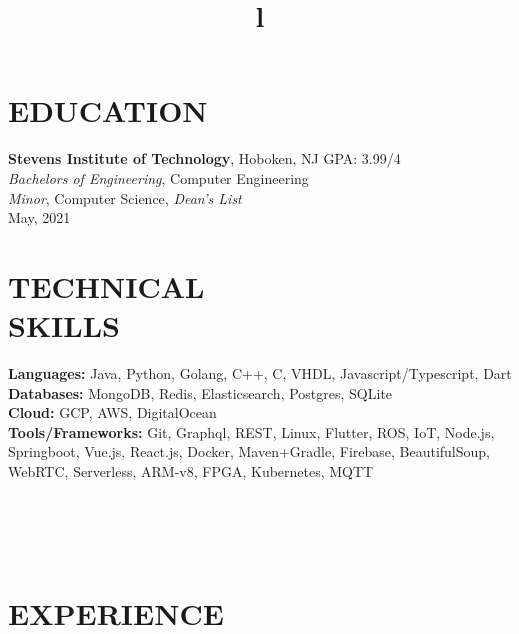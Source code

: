 \documentclass[margin]{res}
\begin{document}
\begin{resume}


\section{EDUCATION}
\textbf{Stevens Institute of Technology}, Hoboken, NJ \hfill GPA: 3.99/4\\
{\sl Bachelors of Engineering}, Computer Engineering\\
{\sl Minor}, Computer Science, {\sl Dean's List}\\
May, 2021

\section{TECHNICAL\\SKILLS}

\textbf{Languages:} Java, Python, Golang, C++, C, VHDL, Javascript/Typescript, Dart
\\
\textbf{Databases:} MongoDB, Redis, Elasticsearch, Postgres, SQLite
\\
\textbf{Cloud:} GCP, AWS, DigitalOcean
\\
\textbf{Tools/Frameworks:} Git, Graphql, REST, Linux, Flutter, ROS, IoT, Node.js,
Springboot, Vue.js, React.js, Docker, Maven+Gradle, Firebase, BeautifulSoup,
WebRTC, Serverless, ARM-v8, FPGA, Kubernetes, MQTT

\begin{format}
\title{l}\\
\\
\body\\
\end{format}

\section{EXPERIENCE}


\end{resume}
\end{document}
